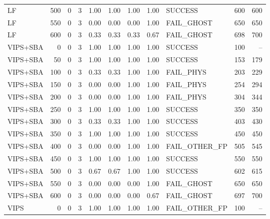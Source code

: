 \begin{tabular}{lrrr|rrrr|lrr}
  LF                             &  500 &    0 &   3 & 1.00 & 1.00 & 1.00 & 1.00 & SUCCESS         &   600 &   600 \\
  LF                             &  550 &    0 &   3 & 0.00 & 0.00 & 0.00 & 1.00 & FAIL_GHOST      &   650 &   650 \\
  LF                             &  600 &    0 &   3 & 0.33 & 0.33 & 0.33 & 0.67 & FAIL_GHOST      &   698 &   700 \\
  VIPS+SBA                       &    0 &    0 &   3 & 1.00 & 1.00 & 1.00 & 1.00 & SUCCESS         &   100 &    -- \\
  VIPS+SBA                       &   50 &    0 &   3 & 1.00 & 1.00 & 1.00 & 1.00 & SUCCESS         &   153 &   179 \\
  VIPS+SBA                       &  100 &    0 &   3 & 0.33 & 0.33 & 1.00 & 1.00 & FAIL_PHYS       &   203 &   229 \\
  VIPS+SBA                       &  150 &    0 &   3 & 0.00 & 0.00 & 1.00 & 1.00 & FAIL_PHYS       &   254 &   294 \\
  VIPS+SBA                       &  200 &    0 &   3 & 0.00 & 0.00 & 1.00 & 1.00 & FAIL_PHYS       &   304 &   344 \\
  VIPS+SBA                       &  250 &    0 &   3 & 1.00 & 1.00 & 1.00 & 1.00 & SUCCESS         &   350 &   350 \\
  VIPS+SBA                       &  300 &    0 &   3 & 0.33 & 0.33 & 1.00 & 1.00 & SUCCESS         &   403 &   430 \\
  VIPS+SBA                       &  350 &    0 &   3 & 1.00 & 1.00 & 1.00 & 1.00 & SUCCESS         &   450 &   450 \\
  VIPS+SBA                       &  400 &    0 &   3 & 0.00 & 0.00 & 1.00 & 1.00 & FAIL_OTHER_FP   &   505 &   545 \\
  VIPS+SBA                       &  450 &    0 &   3 & 1.00 & 1.00 & 1.00 & 1.00 & SUCCESS         &   550 &   550 \\
  VIPS+SBA                       &  500 &    0 &   3 & 0.67 & 0.67 & 1.00 & 1.00 & SUCCESS         &   602 &   615 \\
  VIPS+SBA                       &  550 &    0 &   3 & 0.00 & 0.00 & 0.00 & 1.00 & FAIL_GHOST      &   650 &   650 \\
  VIPS+SBA                       &  600 &    0 &   3 & 0.00 & 0.00 & 0.00 & 0.67 & FAIL_GHOST      &   697 &   700 \\
  VIPS                           &    0 &    0 &   3 & 1.00 & 1.00 & 1.00 & 1.00 & FAIL_OTHER_FP   &   100 &    -- \\

\end{tabular}
